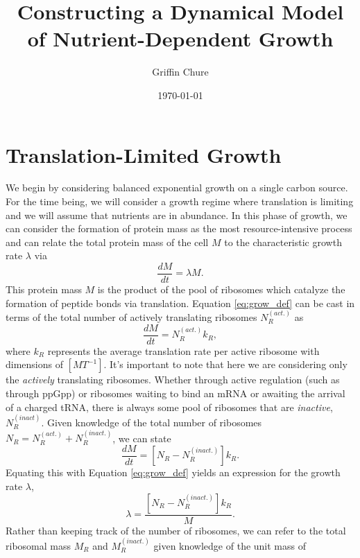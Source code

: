 \documentclass[letterpaper, 11pt]{article}
\title{Constructing a Dynamical Model of Nutrient-Dependent Growth}
\author{Griffin Chure}
\date{\today}
\begin{document}
\maketitle

\section{Translation-Limited Growth}\label{sec:translation_limited_growth}
We begin by considering balanced exponential growth on a single carbon source.
For the time being, we will consider a growth regime where translation is
limiting and we will assume that nutrients are in abundance.  
In this phase of growth, we can consider the formation of protein mass
as the most resource-intensive process and can relate the total 
protein mass of the cell $M$ to the characteristic growth rate $\lambda$ via 
\begin{equation}\label{eq:grow_def}
\frac{dM}{dt} = \lambda M.
\end{equation}
This protein mass $M$ is the product of the pool of ribosomes which catalyze the
formation of peptide bonds via translation. Equation \eqref{eq:grow_def} can be 
cast in terms of the total number of actively translating ribosomes $N_R^{(act.)}$
as 
\begin{equation}
\frac{dM}{dt} = N_R^{(act.)}k_R,
\end{equation}
where $k_R$ represents the average translation rate per active ribosome with
dimensions of $[MT^{-1}]$. It's important to note that here we are considering
only  the \textit{actively} translating ribosomes. Whether through active
regulation (such as through ppGpp) or ribosomes waiting to bind an mRNA or 
awaiting the arrival of a charged tRNA, there is always some pool of ribosomes 
that are \textit{inactive}, $N_R^{(inact)}$. Given knowledge of the total number
of ribosomes $N_R = N_R^{(act.)} + N_R^{(inact.)}$, we can state 
\begin{equation}
    \frac{dM}{dt} = \left[N_R - N_R^{(inact.)}\right] k_R.
    \label{eq:growth_Nr}
\end{equation}
Equating this with Equation \eqref{eq:grow_def} yields an expression for the
growth rate $\lambda$,
\begin{equation}
\lambda = \frac{\left[N_R - N_R^{(inact.)}\right]k_R}{M}.
\label{eq:lam_nr}
\end{equation}
Rather than keeping track of the number of ribosomes, we can refer to the total 
ribosomal mass $M_R$ and $M_R^{(inact.)}$ given knowledge of the unit mass of
\end{document}
